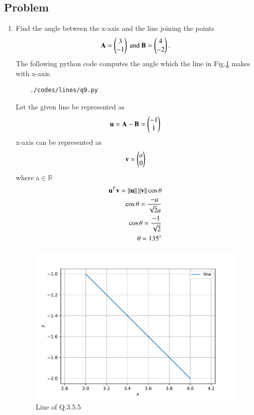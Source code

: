 \subsection{Problem}

\renewcommand{\theequation}{\theenumi}
\begin{enumerate}[label=\thesection.\arabic*.,ref=\thesection.\theenumi]
	\item Find the angle between the x-axis and the line joining the points 
	\begin{align}
\mathbf{A} = \begin{pmatrix}3\\-1\end{pmatrix}\text{ and }\mathbf{B} = \begin{pmatrix}4\\-2\end{pmatrix}.
	\end{align}
	The following python code computes the angle which the line in Fig.\ref{fig:qnine} makes with x-axis.
	\begin{lstlisting}
	./codes/lines/q9.py
	\end{lstlisting}
	
	\solution Let the given line be represented as 
	\begin{align}
	\mathbf{u} = \mathbf{A-B} = \begin{pmatrix}-1\\1\end{pmatrix}
	\end{align}
	x-axis can be represented as
	\begin{align}
	\mathbf{v} = \begin{pmatrix}a\\0\end{pmatrix}
	\end{align}
where a$ \in \mathbb{R}$\\
\begin{align}
\mathbf{u}^T\mathbf{v} = \left\lVert\mathbf{u}\right\rVert\left\lVert\mathbf{v}\right\rVert\cos{\theta}
	\\
	\cos{\theta} = \frac{-a}{\sqrt{2}a}
	\\
	\cos{\theta} = \frac{-1}{\sqrt{2}}
	\\
	\theta = 135\degree 
\end{align}

	\begin{figure}[!ht]
	\centering
	\includegraphics[width=\columnwidth]{./figs/lines/q9.pdf}
	\caption{Line of Q.3.5.5}
	\label{fig:qnine}	
	\end{figure}
	
\end{enumerate}

